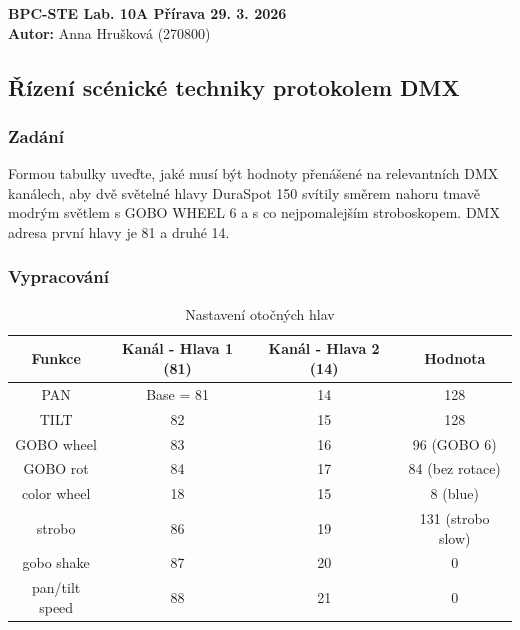 \documentclass[12pt, a4paper]{article}
\begin{document}
\begin{center}
    {\large \textbf{BPC-STE Lab. 10A Přírava 29. 3. 2026}}\\[0.15cm]
    {\large \textbf{Autor:} Anna Hrušková (270800)}\\[0.15cm]
\end{center}
\vspace{0.4cm} %

\subsection*{Řízení scénické techniky protokolem DMX}

\subsubsection*{Zadání}
\qquad Formou tabulky uveďte, jaké musí být hodnoty přenášené na relevantních DMX kanálech, aby dvě světelné hlavy DuraSpot 150 svítily směrem nahoru tmavě modrým světlem s GOBO WHEEL 6 a s co nejpomalejším stroboskopem. DMX adresa první hlavy je 81 a druhé 14.

\subsubsection*{Vypracování}
\begin{table}[h]
\caption{Nastavení otočných hlav}
\centering
\begin{tabular}{c|c|c|c}
\hline
Funkce & Kanál - Hlava 1 (81) & Kanál - Hlava 2 (14) & Hodnota\\
\hline
\hline
PAN & Base = 81 & 14 & 128 \\
TILT & 82 & 15 & 128 \\
GOBO wheel & 83 & 16 & 96 (GOBO 6)\\
GOBO rot & 84 & 17 & 84 (bez rotace)\\
color wheel & 18 & 15 & 8 (blue) \\
strobo & 86 & 19 & 131 (strobo slow) \\
gobo shake & 87 & 20 & 0 \\
pan/tilt speed & 88 & 21 & 0 \\
\hline
\end{tabular}
\label{tab}
\end{table}


\end{document}
